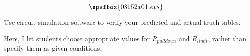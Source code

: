 

$$\epsfbox{03152x01.eps}$$

\vfil \eject






Use circuit simulation software to verify your predicted and actual truth tables.







Here, I let students choose appropriate values for $R_{pulldown}$ and $R_{limit}$, rather than specify them as given conditions.




